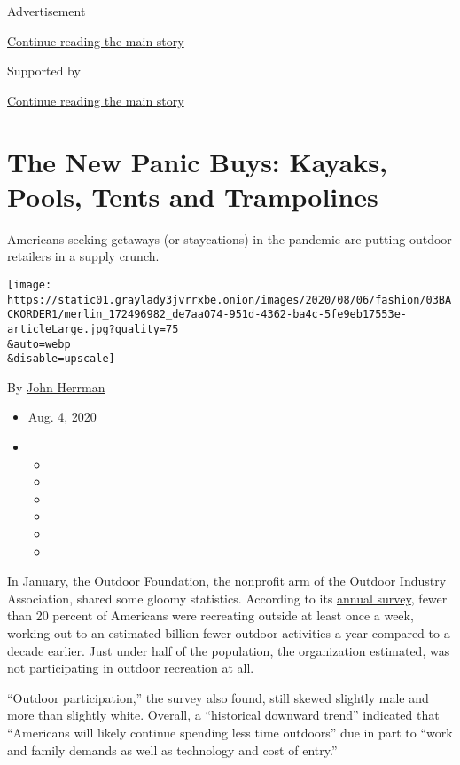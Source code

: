 Advertisement

\protect\hyperlink{after-top}{Continue reading the main story}

Supported by

\protect\hyperlink{after-sponsor}{Continue reading the main story}

\hypertarget{the-new-panic-buys-kayaks-pools-tents-and-trampolines}{%
\section{The New Panic Buys: Kayaks, Pools, Tents and
Trampolines}\label{the-new-panic-buys-kayaks-pools-tents-and-trampolines}}

Americans seeking getaways (or staycations) in the pandemic are putting
outdoor retailers in a supply crunch.

\texttt{[image: https://static01.graylady3jvrrxbe.onion/images/2020/08/06/fashion/03BACKORDER1/merlin\_172496982\_de7aa074-951d-4362-ba4c-5fe9eb17553e-articleLarge.jpg?quality=75\\\&auto=webp\\\&disable=upscale]}

By \href{https://www.nytimes3xbfgragh.onion/by/john-herrman}{John
Herrman}

\begin{itemize}
\item
  Aug. 4, 2020
\item
  \begin{itemize}
  \item
  \item
  \item
  \item
  \item
  \item
  \end{itemize}
\end{itemize}

In January, the Outdoor Foundation, the nonprofit arm of the Outdoor
Industry Association, shared some gloomy statistics. According to its
\href{https://outdoorindustry.org/resource/2019-outdoor-participation-report/}{annual
survey}, fewer than 20 percent of Americans were recreating outside at
least once a week, working out to an estimated billion fewer outdoor
activities a year compared to a decade earlier. Just under half of the
population, the organization estimated, was not participating in outdoor
recreation at all.

``Outdoor participation,'' the survey also found, still skewed slightly
male and more than slightly white. Overall, a ``historical downward
trend'' indicated that ``Americans will likely continue spending less
time outdoors'' due in part to ``work and family demands as well as
technology and cost of entry.''

